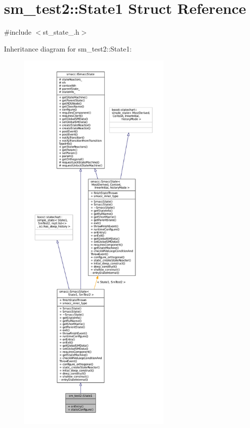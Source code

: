 \hypertarget{structsm__test2_1_1State1}{}\section{sm\+\_\+test2\+:\+:State1 Struct Reference}
\label{structsm__test2_1_1State1}


{\ttfamily \#include $<$st\+\_\+state\+\_.\+h$>$}



Inheritance diagram for sm\+\_\+test2\+:\+:State1\+:
\nopagebreak
\begin{figure}[H]
\begin{center}
\leavevmode
\includegraphics[height=550pt]{structsm__test2_1_1State1__inherit__graph}
\end{center}
\end{figure}


